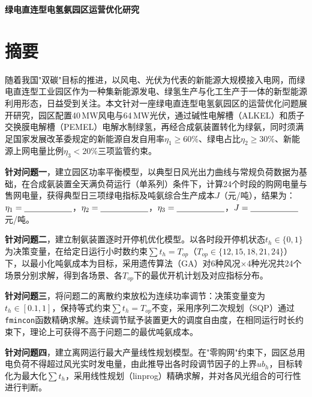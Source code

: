 \documentclass[UTF8,12pt,a4paper]{ctexart}
\newcommand{\blank}[1]{\underline{\makebox[#1][c]{}}}
\newcommand{\RES}{\blank{2cm}}          %
\begin{document}

\begin{center}
  \vspace*{1cm}
  {\bfseries 绿电直连型电氢氨园区运营优化研究}
  \vspace{0.5cm}
\end{center}

\section*{摘\quad 要}

随着我国"双碳"目标的推进，以风电、光伏为代表的新能源大规模接入电网，而绿电直连型工业园区作为一种集新能源发电、绿氢生产与化工生产于一体的新型能源利用形态，日益受到关注。本文针对一座绿电直连型电氢氨园区的运营优化问题展开研究，园区配置40\,MW风电与64\,MW光伏，通过碱性电解槽（ALKEL）和质子交换膜电解槽（PEMEL）电解水制绿氢，再经合成氨装置转化为绿氨，同时须满足国家发展改革委规定的新能源自发自用率$\eta_1\geq 60\%$、绿电占比$\eta_2\geq 30\%$、新能源上网电量比例$\eta_3<20\%$三项监管约束。

\textbf{针对问题一}，建立园区功率平衡模型，以典型日风光出力曲线与常规负荷数据为基础，在合成氨装置全天满负荷运行（单系列）条件下，计算24个时段的购网电量与售网电量，获得典型日三项绿电指标及吨氨综合生产成本$J$（元/吨），结果为：$\eta_1=\RES$，$\eta_2=\RES$，$\eta_3=\RES$，$J=\RES$\,元/吨。

\textbf{针对问题二}，建立制氨装置逐时开停机优化模型。以各时段开停机状态$t_h\in\{0,1\}$为决策变量，在给定日运行小时数约束$\sum t_h=T_{op}$（$T_{op}\in\{12,15,18,21,24\}$）下，以最小化吨氨成本为目标，采用遗传算法（GA）对6种风况$\times$4种光况共24个场景分别求解，得到各场景、各$T_{op}$下的最优开机计划及对应指标分布。

\textbf{针对问题三}，将问题二的离散约束放松为连续功率调节：决策变量变为$t_h\in[0.1,1]$，保持等式约束$\sum t_h=T_{op}$不变，采用序列二次规划（SQP）通过\texttt{fmincon}函数精确求解。连续调节赋予装置更大的调度自由度，在相同运行时长约束下，理论上可获得不高于问题二的最优吨氨成本。

\textbf{针对问题四}，建立离网运行最大产量线性规划模型。在"零购网"约束下，园区总用电负荷不得超过风光实时发电量，由此推导出各时段调节因子的上界$ub_h$，目标转化为最大化$\sum t_h$，采用线性规划（linprog）精确求解，并对各风光组合的可行性进行判断。
\end{document}
